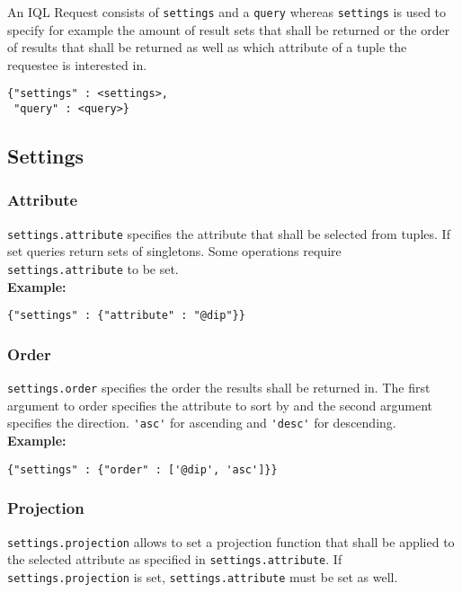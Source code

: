 \documentclass[12pt]{article}
\begin{document}
An IQL Request consists of \verb|settings| and a \verb|query| whereas \verb|settings| is used to specify for example the amount of result sets that shall be returned
or the order of results that shall be returned as well as which attribute of a tuple the requestee is interested in. 

\begin{verbatim}
{"settings" : <settings>,
 "query" : <query>}
\end{verbatim}

\subsection{Settings}

\subsubsection{Attribute}

\verb|settings.attribute| specifies the attribute that shall be selected from tuples. If set queries return sets of singletons. Some operations require \verb|settings.attribute| to be set. \\

\textbf{Example:}
\begin{verbatim}
{"settings" : {"attribute" : "@dip"}}
\end{verbatim}

\subsubsection{Order}

\verb|settings.order| specifies the order the results shall be returned in. The first argument to order specifies the attribute to sort by and the second argument specifies the direction.
\verb|'asc'| for ascending and \verb|'desc'| for descending.\\

\textbf{Example:}
\begin{verbatim}
{"settings" : {"order" : ['@dip', 'asc']}}
\end{verbatim}

\subsubsection{Projection}

\verb|settings.projection| allows to set a projection function that shall be applied to the selected attribute as specified in \verb|settings.attribute|. If \verb|settings.projection| is set, 
\verb|settings.attribute| must be set as well. \\
\end{document}
